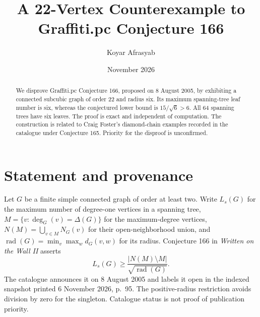 \documentclass[11pt,a4paper]{article}
\title{A 22-Vertex Counterexample to Graffiti.pc Conjecture 166}
\author{Koyar Afrasyab}
\date{November 2026}
\begin{document}
\maketitle
\begin{abstract}
We disprove Graffiti.pc Conjecture 166, proposed on 8 August 2005, by exhibiting a connected subcubic graph of order 22 and radius six. Its maximum spanning-tree leaf number is six, whereas the conjectured lower bound is $15/\sqrt6>6$. All 64 spanning trees have six leaves. The proof is exact and independent of computation. The construction is related to Craig Foster's diamond-chain examples recorded in the catalogue under Conjecture 165. Priority for the disproof is unconfirmed.
\end{abstract}
\section{Statement and provenance}
Let $G$ be a finite simple connected graph of order at least two. Write $L_s(G)$ for the maximum number of degree-one vertices in a spanning tree, $M=\{v:\deg_G(v)=\Delta(G)\}$ for the maximum-degree vertices, $N(M)=\bigcup_{v\in M}N_G(v)$ for their open-neighborhood union, and $\operatorname{rad}(G)=\min_v\max_w d_G(v,w)$ for its radius. Conjecture 166 in \emph{Written on the Wall II} \cite{wow} asserts
\begin{equation}\label{conj}
 L_s(G)\ge\frac{|N(M)\setminus M|}{\sqrt{\operatorname{rad}(G)}}.
\end{equation}
The catalogue announces it on 8 August 2005 and labels it open in the indexed snapshot printed 6 November 2026, p.~95. The positive-radius restriction avoids division by zero for the singleton. Catalogue status is not proof of publication priority.
\end{document}
